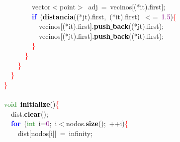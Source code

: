 \mbox{}\ \ \ \ \ \ \ \ \ \ vector\textcolor{BrickRed}{$<$}point\textcolor{BrickRed}{$>$}\ adj\ \textcolor{BrickRed}{=}\ vecinos\textcolor{BrickRed}{[(*}it\textcolor{BrickRed}{).}first\textcolor{BrickRed}{];} \\
\mbox{}\ \ \ \ \ \ \ \ \ \ \textbf{\textcolor{Blue}{if}}\ \textcolor{BrickRed}{(}\textbf{\textcolor{Black}{distancia}}\textcolor{BrickRed}{((*}jt\textcolor{BrickRed}{).}first\textcolor{BrickRed}{,}\ \textcolor{BrickRed}{(*}it\textcolor{BrickRed}{).}first\textcolor{BrickRed}{)}\ \textcolor{BrickRed}{$<$=}\ \textcolor{Purple}{1.5}\textcolor{BrickRed}{)}\textcolor{Red}{\{} \\
\mbox{}\ \ \ \ \ \ \ \ \ \ \ \ vecinos\textcolor{BrickRed}{[(*}it\textcolor{BrickRed}{).}first\textcolor{BrickRed}{].}\textbf{\textcolor{Black}{push$\_$back}}\textcolor{BrickRed}{((*}jt\textcolor{BrickRed}{).}first\textcolor{BrickRed}{);} \\
\mbox{}\ \ \ \ \ \ \ \ \ \ \ \ vecinos\textcolor{BrickRed}{[(*}jt\textcolor{BrickRed}{).}first\textcolor{BrickRed}{].}\textbf{\textcolor{Black}{push$\_$back}}\textcolor{BrickRed}{((*}it\textcolor{BrickRed}{).}first\textcolor{BrickRed}{);} \\
\mbox{}\ \ \ \ \ \ \ \ \ \ \textcolor{Red}{\}} \\
\mbox{}\ \ \ \ \ \ \ \ \textcolor{Red}{\}} \\
\mbox{}\ \ \ \ \ \ \textcolor{Red}{\}} \\
\mbox{}\ \ \ \ \textcolor{Red}{\}} \\
\mbox{}\ \ \textcolor{Red}{\}} \\
\mbox{}\ \  \\
\mbox{}\ \ \textcolor{ForestGreen}{void}\ \textbf{\textcolor{Black}{initialize}}\textcolor{BrickRed}{()}\textcolor{Red}{\{} \\
\mbox{}\ \ \ \ dist\textcolor{BrickRed}{.}\textbf{\textcolor{Black}{clear}}\textcolor{BrickRed}{();} \\
\mbox{}\ \ \ \ \textbf{\textcolor{Blue}{for}}\ \textcolor{BrickRed}{(}\textcolor{ForestGreen}{int}\ i\textcolor{BrickRed}{=}\textcolor{Purple}{0}\textcolor{BrickRed}{;}\ i\textcolor{BrickRed}{$<$}nodos\textcolor{BrickRed}{.}\textbf{\textcolor{Black}{size}}\textcolor{BrickRed}{();}\ \textcolor{BrickRed}{++}i\textcolor{BrickRed}{)}\textcolor{Red}{\{} \\
\mbox{}\ \ \ \ \ \ dist\textcolor{BrickRed}{[}nodos\textcolor{BrickRed}{[}i\textcolor{BrickRed}{]]}\ \textcolor{BrickRed}{=}\ infinity\textcolor{BrickRed}{;} \\

